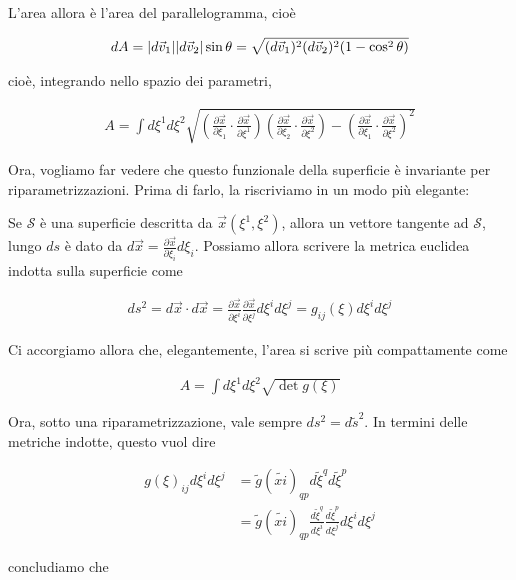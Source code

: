 \documentclass{report}
\begin{document}
L'area allora è l'area del parallelogramma, cioè 

\begin{align}
    dA = \lvert d\vec{v}_1\rvert\lvert d\vec{v}_2\rvert\sin\theta = \sqrt{(d\vec{v}_1)^2(d\vec{v}_2)^2(1-\cos^2\theta)}
\end{align}

cioè, integrando nello spazio dei parametri, 

\begin{align}
    A = \int d\xi^1 d\xi^2 \sqrt{\left(\frac{\partial\vec{x}}{\partial \xi_1}\cdot \frac{\partial \vec{x}}{\partial \xi^1}\right)\left(\frac{\partial\vec{x}}{\partial \xi_2}\cdot \frac{\partial \vec{x}}{\partial \xi^2}\right) - \left(\frac{\partial\vec{x}}{\partial \xi_1}\cdot \frac{\partial \vec{x}}{\partial \xi^2}\right)^2}
\end{align}

Ora, vogliamo far vedere che questo funzionale della superficie è invariante per riparametrizzazioni. Prima di farlo, la riscriviamo in un modo più elegante: 

Se \(\mathcal{S}\) è una superficie descritta da \(\vec{x}(\xi^1, \xi^2)\), allora un vettore tangente ad \(\mathcal{S}\), lungo \(ds\) è dato da \(d\vec{x} = \frac{\partial \vec{x}}{\partial \xi_i}d\xi_i\). Possiamo allora scrivere la metrica euclidea indotta sulla superficie come 

\begin{align}
    ds^2 = d\vec{x}\cdot d\vec{x} = \frac{\partial\vec{x}}{\partial \xi^i}\frac{\partial\vec{x}}{\partial \xi^j}d\xi^i d\xi^j = g_{ij}(\xi)d\xi^i d\xi^j
\end{align}

Ci accorgiamo allora che, elegantemente, l'area si scrive più compattamente come 

\begin{align}
    A = \int d\xi^1 d\xi^2 \sqrt{\det{g(\xi)}}
\end{align}

Ora, sotto una riparametrizzazione, vale sempre \(ds^2 = d\tilde{s}^2\). In termini delle metriche indotte, questo vuol dire 

\begin{align}
    g(\xi)_{ij}d\xi^i d\xi^j &= \tilde{g}(\tilde{xi})_{qp}d\tilde{\xi}^q d\tilde{\xi}^p \\
    &= \tilde{g}(\tilde{xi})_{qp}\frac{d\tilde{\xi}^q}{d\xi^i}\frac{d\tilde{\xi}^p}{d\xi^j}d\xi^i d\xi^j 
\end{align}

concludiamo che 
\end{document}
